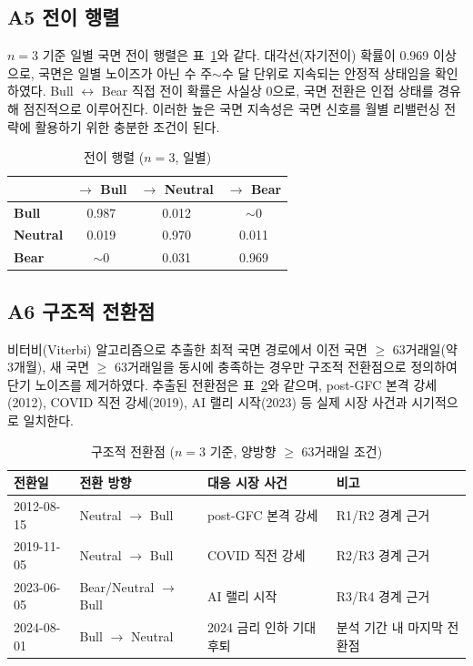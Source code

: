 \documentclass[eng]{kjas3}
\begin{document}
\subsection*{A5 전이 행렬}

$n = 3$ 기준 일별 국면 전이 행렬은 표~\ref{tab:a1_trans}와 같다. 대각선(자기전이) 확률이 0.969 이상으로, 국면은 일별 노이즈가 아닌 수 주$\sim$수 달 단위로 지속되는 안정적 상태임을 확인하였다. Bull $\leftrightarrow$ Bear 직접 전이 확률은 사실상 0으로, 국면 전환은 인접 상태를 경유해 점진적으로 이루어진다. 이러한 높은 국면 지속성은 국면 신호를 월별 리밸런싱 전략에 활용하기 위한 충분한 조건이 된다.

\begin{table}[t]
\centering
\caption{전이 행렬 ($n=3$, 일별)}
\label{tab:a1_trans}
\begin{tabular}{lccc}
\toprule
 & \textbf{$\rightarrow$ Bull} & \textbf{$\rightarrow$ Neutral} & \textbf{$\rightarrow$ Bear} \\
\midrule
\textbf{Bull}    & 0.987 & 0.012 & $\sim$0 \\
\textbf{Neutral} & 0.019 & 0.970 & 0.011 \\
\textbf{Bear}    & $\sim$0 & 0.031 & 0.969 \\
\bottomrule
\end{tabular}
\end{table}

\subsection*{A6 구조적 전환점}

비터비(Viterbi) 알고리즘으로 추출한 최적 국면 경로에서 이전 국면 $\geq$ 63거래일(약 3개월), 새 국면 $\geq$ 63거래일을 동시에 충족하는 경우만 구조적 전환점으로 정의하여 단기 노이즈를 제거하였다. 추출된 전환점은 표~\ref{tab:a1_breaks}와 같으며, post-GFC 본격 강세(2012), COVID 직전 강세(2019), AI 랠리 시작(2023) 등 실제 시장 사건과 시기적으로 일치한다.

\begin{table}[t]
\centering
\caption{구조적 전환점 ($n=3$ 기준, 양방향 $\geq$ 63거래일 조건)}
\label{tab:a1_breaks}
\begin{tabular}{llll}
\toprule
\textbf{전환일} & \textbf{전환 방향} & \textbf{대응 시장 사건} & \textbf{비고} \\
\midrule
2012-08-15 & Neutral $\rightarrow$ Bull & post-GFC 본격 강세      & R1/R2 경계 근거 \\
2019-11-05 & Neutral $\rightarrow$ Bull & COVID 직전 강세         & R2/R3 경계 근거 \\
2023-06-05 & Bear/Neutral $\rightarrow$ Bull & AI 랠리 시작       & R3/R4 경계 근거 \\
2024-08-01 & Bull $\rightarrow$ Neutral & 2024 금리 인하 기대 후퇴 & 분석 기간 내 마지막 전환점 \\
\bottomrule
\end{tabular}
\end{table}
\end{document}
